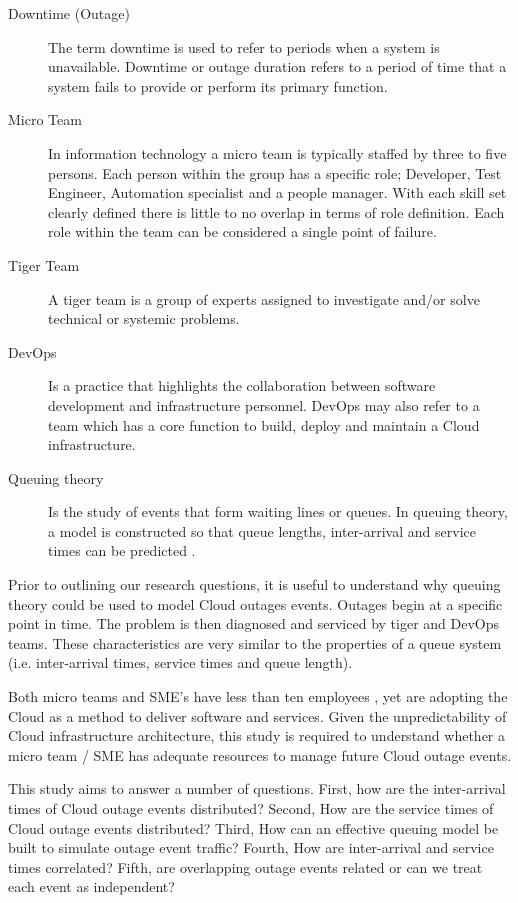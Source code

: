 \documentclass[5p]{elsarticle}
\begin{document}
\begin{description}
 \item [Downtime (Outage)] The term downtime is used to refer to periods when a system is unavailable. Downtime or outage duration refers to a period of time that a system fails to provide or perform its primary function. 
 \item  [Micro Team] In information technology a micro team is typically staffed by three to five persons. Each person within the group has a specific role; Developer, Test Engineer, Automation specialist and a people manager. With each skill set clearly defined there is little to no overlap in terms of role definition. Each role within the team can be considered a single point of failure.
  \item [Tiger Team] A tiger team is a group of experts assigned to investigate and/or solve technical or systemic problems. 
 \item [DevOps] Is a practice that highlights the collaboration between software development and infrastructure personnel. DevOps may also refer to a team which has a core function to build, deploy and maintain a Cloud infrastructure. 
 \item [Queuing theory] Is the study of events that form waiting lines or queues. In queuing theory, a model is constructed so that queue lengths, inter-arrival and service times can be predicted \cite{kleinrock1975queuing, gross2008fundamentals, sundarapandian2009probability}.
\end{description}

Prior to outlining our research questions, it is useful to understand why queuing theory could be used to model Cloud outages events. Outages begin at a specific point in time. The problem is then diagnosed and serviced by tiger and DevOps teams. These characteristics are very similar to the properties of a queue system (i.e. inter-arrival times, service times and queue length). 

Both micro teams and SME's have less than ten employees \cite{eusmereport2015}, yet are adopting the Cloud as a method to deliver software and services. Given the unpredictability of Cloud infrastructure architecture, this study is required to understand whether a micro team / SME has adequate resources to manage future Cloud outage events. 

This study aims to answer a number of questions. First, how are the inter-arrival times of Cloud outage events distributed? Second, How are the service times of Cloud outage events distributed?  Third, How can an effective queuing model be built to simulate outage event traffic? Fourth, How are inter-arrival and service times correlated? Fifth, are overlapping outage events related or can we treat each event as independent? 
\end{document}
